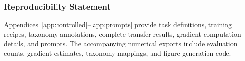 \documentclass{article} %
\begin{document}
\subsubsection*{Reproducibility Statement}
Appendices~\ref{app:controlled}--\ref{app:prompts} provide task definitions, training recipes, taxonomy annotations, complete transfer results, gradient computation details, and prompts. The accompanying numerical exports include evaluation counts, gradient estimates, taxonomy mappings, and figure-generation code.




\appendix
{}  %


\end{document}
